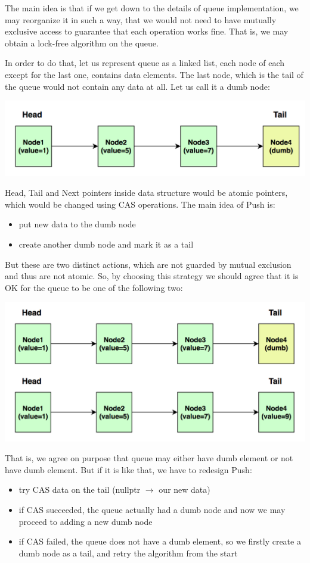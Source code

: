 \documentclass{article}
\begin{document}
The main idea is that if we get down to the details of queue implementation, we may reorganize it in such a way, that we would not need to have mutually exclusive access to guarantee that each operation works fine. That is, we may obtain a lock-free algorithm on the queue.

In order to do that, let us represent queue as a linked list, each node of each except for the last one, contains data elements. The last node, which is the tail of the queue would not contain any data at all. Let us call it a dumb node:

\begin{center}\includegraphics[width=0.5 \textwidth]{image4.png}\end{center}

Head, Tail and Next pointers inside data structure would be atomic pointers, which would be changed using CAS operations. The main idea of Push is:
\begin{itemize}
	\item put new data to the dumb node
	\item create another dumb node and mark it as a tail
\end{itemize}

But these are two distinct actions, which are not guarded by mutual exclusion and thus are not atomic. So, by choosing this strategy we should agree that it is OK for the queue to be one of the following two:

\begin{center}\includegraphics[width=0.5 \textwidth]{image5.png}\end{center}

That is, we agree on purpose that queue may either have dumb element or not have dumb element. But if it is like that, we have to redesign Push:

\begin{itemize}
	\item try CAS data on the tail (nullptr $\rightarrow$ our new data)
	\item if CAS succeeded, the queue actually had a dumb node and now we may proceed to adding a new dumb node
	\item if CAS failed, the queue does not have a dumb element, so we firstly create a dumb node as a tail, and retry the algorithm from the start
\end{itemize}
\end{document}
